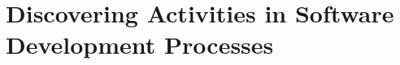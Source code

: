 \chapter{Discovering Activities in Software Development Processes}
\label{chap:project-mining2}


%

%


%

%

%

%


